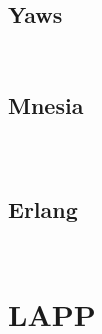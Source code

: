 \begin{lstlisting}[language=bash]

\end{lstlisting}


\section{Yaws}


\begin{lstlisting}[language=bash]

\end{lstlisting}




\begin{lstlisting}[language=bash]

\end{lstlisting}


\section{Mnesia}



\begin{lstlisting}[language=bash]

\end{lstlisting}



\begin{lstlisting}[language=bash]

\end{lstlisting}



\begin{lstlisting}[language=bash]

\end{lstlisting}


\section{Erlang}


\begin{lstlisting}[language=bash]

\end{lstlisting}




\begin{lstlisting}[language=bash]

\end{lstlisting}


\chapter{LAPP}



